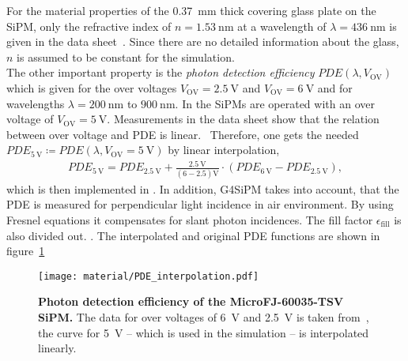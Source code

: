For the material properties of the \SI{0.37}{\milli\meter} thick covering glass plate on the SiPM, only the refractive index of $n = \SI{1.53}{\nano\meter}$ at a wavelength of $\lambda = \SI{436}{\nano\meter}$ is given in the data sheet~\cite{sipm:datasheet}. Since there are no detailed information about the glass, $n$ is assumed to be constant for the simulation.\\

The other important property is the \textit{photon detection efficiency} $PDE(\lambda,V_\text{OV})$ which is given for the over voltages $V_\text{OV}=\SI{2.5}{\volt}$ and $V_\text{OV}=\SI{6}{\volt}$ and for wavelengths $\lambda = \SI{200}{\nano\meter}$ to $\SI{900}{\nano\meter}$. In \iceact the SiPMs are operated with an over voltage of $V_\text{OV} = \SI{5}{\volt}$. Measurements in the data sheet show that the relation between over voltage and PDE is linear.~\cite{sipm:datasheet} Therefore, one gets the needed $PDE_{\SI{5}{\volt}}\coloneqq PDE(\lambda,V_\text{OV}=\SI{5}{\volt})$ by linear interpolation,
\begin{align}
	PDE_{\SI{5}{\volt}} = PDE_{\SI{2.5}{\volt}} + \frac{\SI{2.5}{\volt}}{(6-2.5)\si{\volt}} \cdot (PDE_{\SI{6}{\volt}}-PDE_{\SI{2.5}{\volt}}),
\end{align}
which is then implemented in \geant. In addition, G4SiPM takes into account, that the PDE is measured for perpendicular light incidence in air environment. By using Fresnel equations it compensates for slant photon incidences. The fill factor $\epsilon_\text{fill}$ is also divided out. \cite{sipm:g4sipm,famous:niggemann}. 
The interpolated and original PDE functions are shown in figure~\ref{sipm:pde}

\begin{figure}[H]
	\centering
	\texttt{[image: material/PDE\_interpolation.pdf]}
	\caption[Photon detection efficiency of the MicroFJ-60035-TSV SiPM]{\textbf{Photon detection efficiency of the MicroFJ-60035-TSV SiPM.} The data for over voltages of \SI{6}{\volt} and \SI{2.5}{\volt} is taken from~\cite{sipm:datasheet}, the curve for \SI{5}{\volt} -- which is used in the \geant simulation -- is interpolated linearly.}
	\label{sipm:pde}	
\end{figure}
